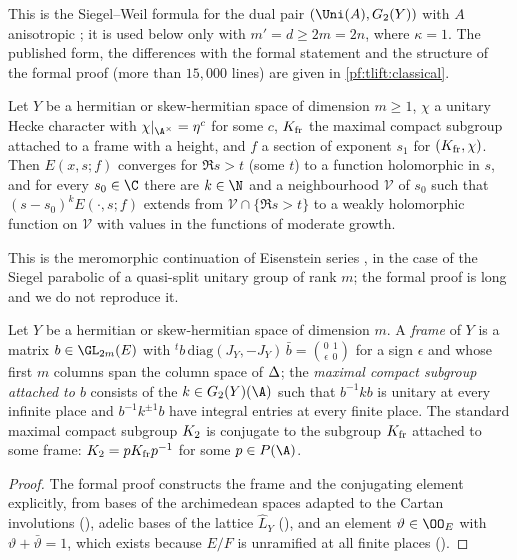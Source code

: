 This is the Siegel--Weil formula for the dual pair $(\Uni(A),G_2(Y))$ with $A$ anisotropic
\cite{Weil1965,KudlaRallis1988,Ichino2007}; it is used below only with $m'=d\ge2m=2n$, where $\kappa=1$. The published form,
the differences with the formal statement and the structure of the formal proof (more than $15{,}000$ lines) are
given in \cref{pf:tlift:classical}.

\begin{theorem}\label{pf:tlift:eisbl}
Let $Y$ be a hermitian or skew-hermitian space of dimension $m\ge1$, $\chi$ a unitary Hecke character with
$\chi|_{\A^\times}=\eta^c$ for some $c$, $K_{\mathrm{fr}}$ the maximal compact subgroup attached to a frame with a height,
and $f$ a section of exponent $s_1$ for $(K_{\mathrm{fr}},\chi)$. Then $E(x,s;f)$ converges for $\Re s>t$ (some $t$) to a
function holomorphic in $s$, and for every $s_0\in\C$ there are $k\in\N$ and a neighbourhood $\mathcal V$ of $s_0$
such that $(s-s_0)^kE(\cdot,s;f)$ extends from $\mathcal V\cap\{\Re s>t\}$ to a weakly holomorphic function on
$\mathcal V$ with values in the functions of moderate growth.
\end{theorem}

This is the meromorphic continuation of Eisenstein series \cite{Langlands1976}, \cite[IV]{MoeglinWaldspurger1995}
in the case of the Siegel parabolic of a quasi-split unitary group of rank $m$; the formal proof is
long and we do not reproduce it.

\begin{lemma}[Frames]\label{pf:tlift:frameconj}
Let $Y$ be a hermitian or skew-hermitian space of dimension $m$. A \emph{frame} of $Y$ is a matrix
$b\in\GL_{2m}(E)$ with ${}^tb\,\mathrm{diag}(J_Y,-J_Y)\,\bar b={0\ \ 1\choose\epsilon\ \ 0}$ for a sign $\epsilon$ and whose
first $m$ columns span the column space of $\Delta$; the \emph{maximal compact subgroup attached to $b$}
consists of the $k\in G_2(Y)(\A)$ such that $b^{-1}kb$ is unitary at every infinite place and $b^{-1}k^{\pm1}b$
have integral entries at every finite place. The standard maximal compact subgroup $K_2$ is conjugate
to the subgroup $K_{\mathrm{fr}}$ attached to some frame: $K_2=pK_{\mathrm{fr}} p^{-1}$ for some $p\in P(\A)$.
\end{lemma}

\begin{proof}
The formal proof constructs the frame and the conjugating element explicitly, from bases of the
archimedean spaces adapted to the Cartan involutions (),
adelic bases of the lattice $\widehat L_Y$ (), and an element
$\vartheta\in\OO_E$ with $\vartheta+\bar\vartheta=1$, which exists because $E/F$ is unramified at all finite places
().
\end{proof}

